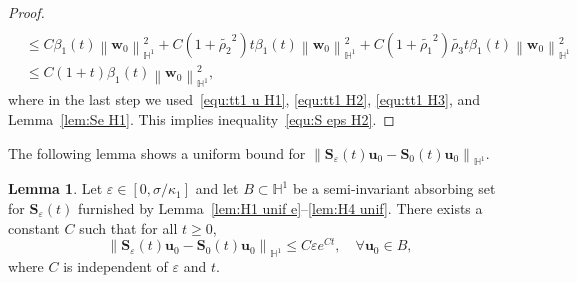 \documentclass[11pt, reqno]{amsart}
\theoremstyle{definition}
\newtheorem{lemma}[theorem]{Lemma}
\numberwithin{equation}{section}
\newcommand{\bff}{\boldsymbol}
\newcommand{\bb}{\mathbb}
\newcommand{\norm}[2]{\left\|{#1}\right\|_{#2}}
\begin{document}
\begin{proof}
\begin{align*}
    \\
    &\leq
    C \beta_1(t) \norm{\bff{w}_0}{\bb{H}^1}^2
    +
    C\left(1+\widetilde{\rho_2}^2 \right) t \beta_1 (t) \norm{\bff{w}_0}{\bb{H}^1}^2
    +
    C \left(1+\widetilde{\rho_1}^2\right) \widetilde{\rho_3} t \beta_1 (t) \norm{\bff{w}_0}{\bb{H}^1}^2
    \\
    &\leq
    C(1+t) \beta_1 (t) \norm{\bff{w}_0}{\bb{H}^1}^2,
\end{align*}
where in the last step we used~\eqref{equ:tt1 u H1}, \eqref{equ:tt1 H2}, \eqref{equ:tt1 H3}, and Lemma~\ref{lem:Se H1}. This implies inequality~\eqref{equ:S eps H2}.
\end{proof}

The following lemma shows a uniform bound for $\norm{\bff{S}_\varepsilon(t) \bff{u}_0- \bff{S}_0(t) \bff{u}_0}{\bb{H}^1}$.

\begin{lemma}\label{lem:Se S0 u0}
Let $\varepsilon\in [0, \sigma/\kappa_1]$ and let $B \subset \bb{H}^1$ be a semi-invariant absorbing set for $\bff{S}_\varepsilon(t)$ furnished by Lemma~\ref{lem:H1 unif e}--\ref{lem:H4 unif}. There exists a constant $C$ such that for all $t\geq 0$,
\begin{equation*}
    \norm{\bff{S}_\varepsilon(t) \bff{u}_0- \bff{S}_0(t) \bff{u}_0}{\bb{H}^1} \leq
    C\varepsilon e^{Ct},
    \quad \forall \bff{u}_0 \in B,
\end{equation*}
where $C$ is independent of $\varepsilon$ and $t$.
\end{lemma}
\end{document}
